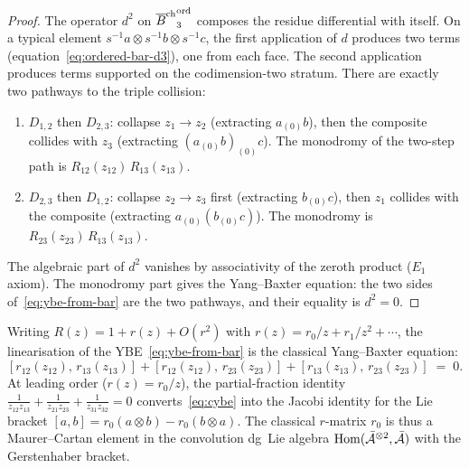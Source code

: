 \begin{proof}
The operator $d^2$ on ${\overline{B}^{\mathrm{ch}}}_3^{\mathrm{ord}}$ composes
the residue differential with itself. On a typical element
$s^{-1}a\otimes s^{-1}b\otimes s^{-1}c$, the first
application of $d$ produces two terms
(equation~\eqref{eq:ordered-bar-d3}), one from each face.
The second application produces terms supported on the
codimension-two stratum. There are exactly two pathways
to the triple collision:
\begin{enumerate}[label=(\roman*)]
\item $D_{1,2}$ then $D_{2,3}$: collapse $z_1\to z_2$
 (extracting $a_{(0)}b$), then the composite collides
 with $z_3$ (extracting $(a_{(0)}b)_{(0)}c$).
 The monodromy of the two-step path is
 $R_{12}(z_{12})\,R_{13}(z_{13})$.
\item $D_{2,3}$ then $D_{1,2}$: collapse $z_2\to z_3$
 first (extracting $b_{(0)}c$), then $z_1$ collides with
 the composite (extracting $a_{(0)}(b_{(0)}c)$).
 The monodromy is
 $R_{23}(z_{23})\,R_{13}(z_{13})$.
\end{enumerate}
The algebraic part of $d^2$ vanishes by associativity of
the zeroth product ($E_1$ axiom). The monodromy part
gives the Yang--Baxter equation: the two sides
of~\eqref{eq:ybe-from-bar} are the two pathways, and their
equality is $d^2=0$.
\end{proof}

\begin{corollary}
\label{cor:classical-ybe}
Writing $R(z)=1+r(z)+O(r^2)$ with
$r(z)=r_0/z+r_1/z^2+\cdots$, the linearisation of
the YBE~\eqref{eq:ybe-from-bar} is the classical
Yang--Baxter equation:
\begin{equation}\label{eq:cybe}
[r_{12}(z_{12}),\,r_{13}(z_{13})]
+[r_{12}(z_{12}),\,r_{23}(z_{23})]
+[r_{13}(z_{13}),\,r_{23}(z_{23})]
\;=\;0.
\end{equation}
At leading order ($r(z)=r_0/z$), the partial-fraction
identity
$\tfrac{1}{z_{12}z_{13}}+\tfrac{1}{z_{21}z_{23}}
+\tfrac{1}{z_{31}z_{32}}=0$
converts~\eqref{eq:cybe} into the Jacobi identity for the
Lie bracket $[a,b]=r_0(a\otimes b)-r_0(b\otimes a)$. The
classical $r$-matrix $r_0$ is thus a Maurer--Cartan element
in the convolution dg~Lie algebra
$\operatorname{Hom}(\bar{\mathcal{A}}^{\otimes 2},\bar{\mathcal{A}})$ with the
Gerstenhaber bracket.
\end{corollary}

